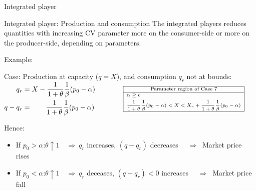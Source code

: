 \documentclass[aspectratio=169,t]{beamer}  %
\begin{document}
\begin{frame}{Integrated player}
\begin{block}{Integrated player: Production and consumption}
The integrated players reduces quantities with increasing CV parameter more on the consumer-side or more on the producer-side, depending on parameters. 
\end{block}
Example:
\begin{block}{Case: Production at capacity ($q=X$), and consumption $q_r$ not at bounds:}
$
\begin{aligned}  
      q_r &= X-\frac{1}{1+\theta} \frac{1}{\beta}(p_0-\alpha) \\
      q-q_r &=\qquad \frac{1}{1+\theta} \frac{1}{\beta}(p_0-\alpha)
     \end{aligned}\qquad\qquad
\scriptsize 
\begin{array}{|c|} 
    \hline
    \text{Parameter region of Case 7} \\ \hline    
    {\begin{aligned} 
             & \alpha \geq c \\
             & \frac{1}{1+\theta} \frac{1}{\beta}(p_0-\alpha) < X < X_r+\frac{1}{1+\theta} \frac{1}{\beta}(p_0-\alpha)
    \end{aligned}} \\ \hline 
\end{array}
$
\end{block}
Hence:
\begin{itemize}
 \item If $p_0 > \alpha$:\quad  $\theta \uparrow 1 \quad \Rightarrow\ q_r$ increases,
       $(q-q_r)$ decreases $ \quad \Rightarrow\ $ Market price rises 
  \item If $p_0 < \alpha$:\quad $\theta \uparrow 1 \quad \Rightarrow\ q_r$ deceases, $(q-q_r)<0$ increases $ \quad \Rightarrow\ $ Market price fall
\end{itemize}

\end{frame}
\end{document}
